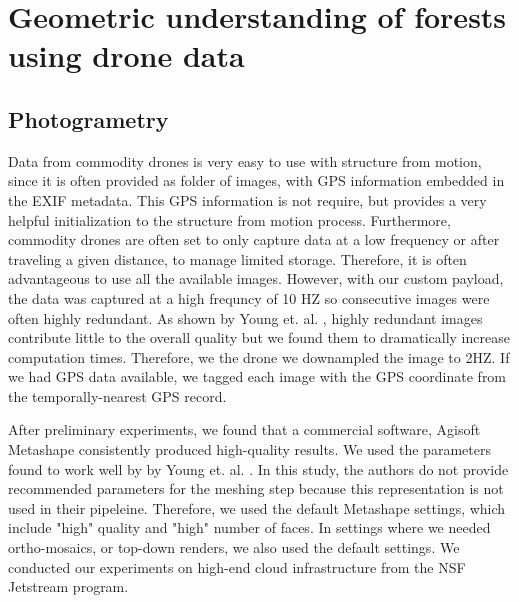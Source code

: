 %
%
%    

\section{Geometric understanding of forests using drone data}
\subsection{Photogrametry}
Data from commodity drones is very easy to use with structure from motion, since it is often provided as folder of images, with GPS information embedded in the EXIF metadata. This GPS information is not require, but provides a very helpful initialization to the structure from motion process. Furthermore, commodity drones are often set to only capture data at a low frequency or after traveling a given distance, to manage limited storage. Therefore, it is often advantageous to use all the available images. However, with our custom payload, the data was captured at a high frequncy of 10 HZ so consecutive images were often highly redundant. As shown by Young et. al. \cite{Young2022}, highly redundant images contribute little to the overall quality but we found them to dramatically increase computation times. Therefore, we the drone we downampled the image to 2HZ. If we had GPS data available, we tagged each image with the GPS coordinate from the temporally-nearest GPS record.   

After preliminary experiments, we found that a commercial software, Agisoft Metashape consistently produced high-quality results. We used the parameters found to work well by by Young et. al. \cite{Young2022}. In this study, the authors do not provide recommended parameters for the meshing step because this representation is not used in their pipeleine. Therefore, we used the default Metashape settings, which include "high" quality and "high" number of faces. In settings where we needed ortho-mosaics, or top-down renders, we also used the default settings. We conducted our experiments on high-end cloud infrastructure from the NSF Jetstream \cite{} program. 



